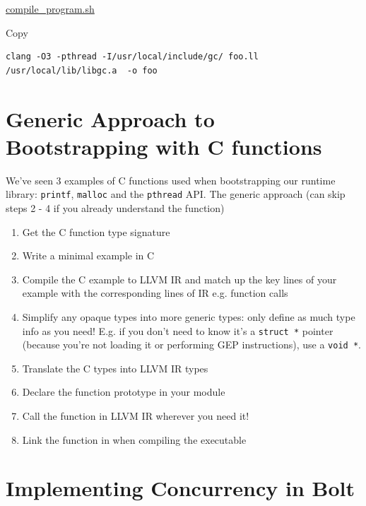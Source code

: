 {
\href{https://github.com/mukul-rathi/bolt/blob/master/scripts/compile_program.sh}{compile\_program.sh}}

Copy

\begin{verbatim}
clang -O3 -pthread -I/usr/local/include/gc/ foo.ll  /usr/local/lib/libgc.a  -o foo
\end{verbatim}

\hypertarget{generic-approach-to-bootstrapping-with-c-functions}{%
\section{\texorpdfstring{\protect\hyperlink{generic-approach-to-bootstrapping-with-c-functions}{}Generic
Approach to Bootstrapping with C
functions}{Generic Approach to Bootstrapping with C functions}}\label{generic-approach-to-bootstrapping-with-c-functions}}

We've seen 3 examples of C functions used when bootstrapping our runtime
library: \texttt{printf}, \texttt{malloc} and the \texttt{pthread} API.
The generic approach (can skip steps 2 - 4 if you already understand the
function)

\begin{enumerate}
\tightlist
\item
  Get the C function type signature
\item
  Write a minimal example in C
\item
  Compile the C example to LLVM IR and match up the key lines of your
  example with the corresponding lines of IR e.g. function calls
\item
  Simplify any opaque types into more generic types: only define as much
  type info as you need! E.g. if you don't need to know it's a
  \texttt{struct\ *} pointer (because you're not loading it or
  performing GEP instructions), use a \texttt{void\ *}.
\item
  Translate the C types into LLVM IR types
\item
  Declare the function prototype in your module
\item
  Call the function in LLVM IR wherever you need it!
\item
  Link the function in when compiling the executable
\end{enumerate}

\hypertarget{implementing-concurrency-in-bolt}{%
\section{\texorpdfstring{\protect\hyperlink{implementing-concurrency-in-bolt}{}Implementing
Concurrency in
Bolt}{Implementing Concurrency in Bolt}}\label{implementing-concurrency-in-bolt}}

